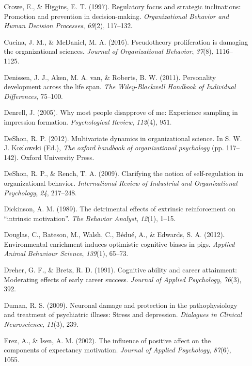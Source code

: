 \documentclass[english,man]{apa6}
\theoremstyle{definition}
\theoremstyle{definition}
\theoremstyle{definition}
\theoremstyle{remark}
\begin{document}
\hypertarget{ref-crowe1997}{}
Crowe, E., \& Higgins, E. T. (1997). Regulatory focus and strategic
inclinations: Promotion and prevention in decision-making.
\emph{Organizational Behavior and Human Decision Processes},
\emph{69}(2), 117--132.

\hypertarget{ref-Cucina2016}{}
Cucina, J. M., \& McDaniel, M. A. (2016). Pseudotheory proliferation is
damaging the organizational sciences. \emph{Journal of Organizational
Behavior}, \emph{37}(8), 1116--1125.

\hypertarget{ref-denissen2011}{}
Denissen, J. J., Aken, M. A. van, \& Roberts, B. W. (2011). Personality
development across the life span. \emph{The Wiley-Blackwell Handbook of
Individual Differences}, 75--100.

\hypertarget{ref-denrell2005}{}
Denrell, J. (2005). Why most people disapprove of me: Experience
sampling in impression formation. \emph{Psychological Review},
\emph{112}(4), 951.

\hypertarget{ref-DeShon2012}{}
DeShon, R. P. (2012). Multivariate dynamics in organizational science.
In S. W. J. Kozlowski (Ed.), \emph{The oxford handbook of organizational
psychology} (pp. 117--142). Oxford University Press.

\hypertarget{ref-deshon2009}{}
DeShon, R. P., \& Rench, T. A. (2009). Clarifying the notion of
self-regulation in organizational behavior. \emph{International Review
of Industrial and Organizational Psychology}, \emph{24}, 217--248.

\hypertarget{ref-dickinson1989}{}
Dickinson, A. M. (1989). The detrimental effects of extrinsic
reinforcement on ``intrinsic motivation''. \emph{The Behavior Analyst},
\emph{12}(1), 1--15.

\hypertarget{ref-douglas2012}{}
Douglas, C., Bateson, M., Walsh, C., Bédué, A., \& Edwards, S. A.
(2012). Environmental enrichment induces optimistic cognitive biases in
pigs. \emph{Applied Animal Behaviour Science}, \emph{139}(1), 65--73.

\hypertarget{ref-dreher1991}{}
Dreher, G. F., \& Bretz, R. D. (1991). Cognitive ability and career
attainment: Moderating effects of early career success. \emph{Journal of
Applied Psychology}, \emph{76}(3), 392.

\hypertarget{ref-duman2009}{}
Duman, R. S. (2009). Neuronal damage and protection in the
pathophysiology and treatment of psychiatric illness: Stress and
depression. \emph{Dialogues in Clinical Neuroscience}, \emph{11}(3),
239.

\hypertarget{ref-erez2002}{}
Erez, A., \& Isen, A. M. (2002). The influence of positive affect on the
components of expectancy motivation. \emph{Journal of Applied
Psychology}, \emph{87}(6), 1055.
\end{document}
